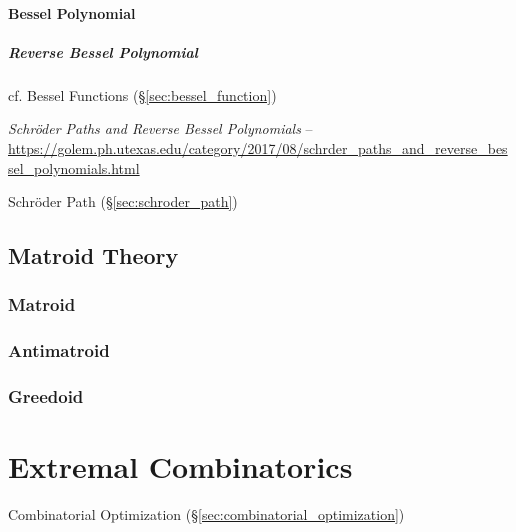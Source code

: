 \paragraph{Bessel Polynomial}\label{sec:bessel_polynomial}\hfill

\subparagraph{Reverse Bessel Polynomial}\label{sec:reverse_bessel_polynomial}
\hfill

cf. Bessel Functions (\S\ref{sec:bessel_function})

\emph{Schr\"oder Paths and Reverse Bessel Polynomials} --
\url{https://golem.ph.utexas.edu/category/2017/08/schrder_paths_and_reverse_bessel_polynomials.html}

Schr\"oder Path (\S\ref{sec:schroder_path})



\subsection{Matroid Theory}\label{sec:matroid_theory}

\subsubsection{Matroid}\label{sec:matroid}

\subsubsection{Antimatroid}\label{sec:antimatroid}

\subsubsection{Greedoid}\label{sec:greedoid}



\section{Extremal Combinatorics}\label{sec:extremal_combinatorics}

Combinatorial Optimization (\S\ref{sec:combinatorial_optimization})



